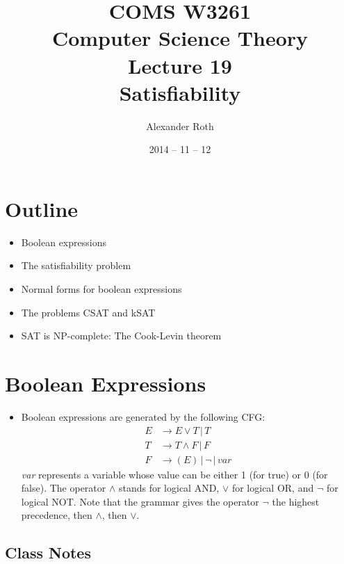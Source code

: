 \documentclass[]{article}
\begin{document}
\newcommand*{\xml}[1]{\texttt{<#1>}}
\theoremstyle{definition}
\newtheorem{thm}{Theorem}
\title{COMS W3261 \\ Computer Science Theory \\ Lecture 19 \\ Satisfiability}
\author{Alexander Roth}
\date{2014 -- 11 -- 12}

\maketitle

\section*{Outline}
\begin{itemize}
\item Boolean expressions
\item The satisfiability problem
\item Normal forms for boolean expressions
\item The problems CSAT and kSAT
\item SAT is NP-complete: The Cook-Levin theorem
\end{itemize}

\section{Boolean Expressions}
\begin{itemize}
\item Boolean expressions are generated by the following CFG:
\begin{align*}
E &\rightarrow E \vee   T \,|\,T \\
T &\rightarrow T \wedge F \,|\,F \\
F &\rightarrow ( E )      \,|\,\neg\,|\,var
\end{align*}
\emph{var} represents a variable whose value can be either 1 (for true) or 0
(for false). The operator $\wedge$ stands for logical AND, $\vee$ for logical
OR, and $\neg$ for logical NOT. Note that the grammar gives the operator $\neg$
the highest precedence, then $\wedge$, then $\vee$.
\end{itemize}
\subsection*{Class Notes}
\end{document}
